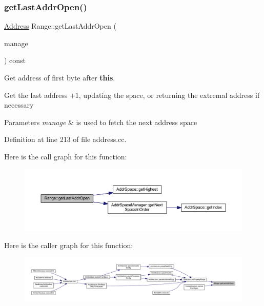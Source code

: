 \subsubsection{\texorpdfstring{getLastAddrOpen()}{getLastAddrOpen()}}
{\footnotesize\ttfamily \mbox{\hyperlink{class_address}{Address}} Range\+::get\+Last\+Addr\+Open (\begin{DoxyParamCaption}\item[{const \mbox{\hyperlink{class_addr_space_manager}{Addr\+Space\+Manager}} $\ast$}]{manage }\end{DoxyParamCaption}) const}



Get address of first byte after {\bfseries{this}}. 

Get the last address +1, updating the space, or returning the extremal address if necessary 
\begin{DoxyParams}{Parameters}
{\em manage} & is used to fetch the next address space \\
\hline
\end{DoxyParams}


Definition at line 213 of file address.\+cc.

Here is the call graph for this function\+:
\nopagebreak
\begin{figure}[H]
\begin{center}
\leavevmode
\includegraphics[width=350pt]{class_range_af5cc1b4a92034ab87269b25950f0fe8f_cgraph}
\end{center}
\end{figure}
Here is the caller graph for this function\+:
\nopagebreak
\begin{figure}[H]
\begin{center}
\leavevmode
\includegraphics[width=350pt]{class_range_af5cc1b4a92034ab87269b25950f0fe8f_icgraph}
\end{center}
\end{figure}
\mbox{\label{class_range_aca96ab5fbb1da6940d807547a9d9ed30}} 
